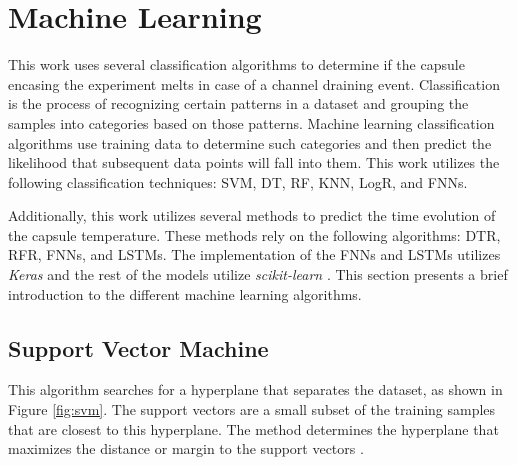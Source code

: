 




\section{Machine Learning}
\label{sec:ML}

This work uses several classification algorithms to determine if the capsule encasing the experiment melts in case of a channel draining event.
Classification is the process of recognizing certain patterns in a dataset and grouping the samples into categories based on those patterns.
Machine learning classification algorithms use training data to determine such categories and then predict the likelihood that subsequent data points will fall into them.
This work utilizes the following classification techniques: \Gls*{SVM}, \Gls*{DT}, \Gls*{RF}, \Gls*{KNN}, \Gls*{LogR}, and \Glspl*{FNN}.

Additionally, this work utilizes several methods to predict the time evolution of the capsule temperature.
These methods rely on the following algorithms: \Gls*{DTR}, \Gls*{RFR}, \Glspl*{FNN}, and \Glspl*{LSTM}.
The implementation of the FNNs and LSTMs utilizes \textit{Keras} \cite{chollet_keras_2015} and the rest of the models
utilize \textit{scikit-learn} \cite{pedregosa_scikit-learn_2011}.
This section presents a brief introduction to the different machine learning algorithms.


\subsection{Support Vector Machine}


This algorithm searches for a hyperplane that separates the dataset, as shown in Figure \ref{fig:svm}.
The support vectors are a small subset of the training samples that are closest to this hyperplane.
The method determines the hyperplane that maximizes the distance or margin to the support vectors \cite{pedregosa_scikit-learn_2011}.

